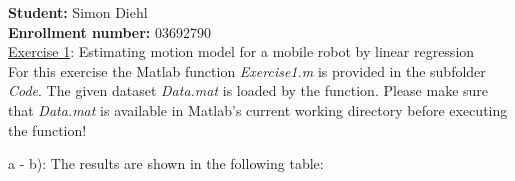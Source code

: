 
\usepackage{comment}
\usepackage{bm}
\usepackage[colorlinks=true, linkcolor=black]{hyperref}
\usepackage{graphicx}
\usepackage{caption}
\usepackage{subcaption}
\usepackage{epstopdf}
\usepackage{placeins}

\newcommand{\an}{3}
\newcommand{\sn}{ML}
\newcommand{\lehrveranstaltung}{Machine Learning in Robotics}
\newcommand{\doctype}{Report for Assignment}
\newcommand{\no}{1}

\usepackage{bm}


\noindent
{}
\sf


\vspace*{0.3cm}


\textbf{Student:} Simon Diehl \\
\textbf{Enrollment number:} 03692790 \\

\ul{Exercise 1}: Estimating motion model for a mobile robot by linear regression \\[3mm]

For this exercise the Matlab function \textit{Exercise1.m} is provided
in the subfolder \textit{Code}. The given dataset \textit{Data.mat} is
loaded by the function. Please make sure that \textit{Data.mat}
is available in Matlab's current working directory before executing the function!

a - b): The results are shown in the following table:

